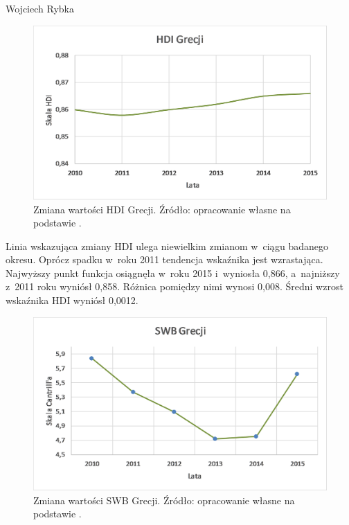 \begin{artplenv}{Wojciech Rybka}
\begin{figure}[h]
	\centering
	\includegraphics[width=1\textwidth]{ART_Rybka/hdi_grecji.png} 
	\caption{Zmiana wartości HDI Grecji.
		Źródło: opracowanie własne na podstawie
		\parencite{united_nations_development_programme_human_2019}.
	}
	\label{fig5:ryb}
\end{figure}

%
%

Linia wskazująca zmiany HDI ulega niewielkim zmianom w~ciągu badanego okresu. Oprócz spadku w~roku 2011 tendencja
wskaźnika jest wzrastająca. Najwyższy punkt funkcja osiągnęła w~roku 2015 i~wyniosła 0,866, a~najniższy z~2011 roku
wyniósł 0,858. Różnica pomiędzy nimi wynosi 0,008. Średni wzrost wskaźnika HDI wyniósł 0,0012. 

\begin{figure}[h]
	\centering
	\includegraphics[width=1\textwidth]{ART_Rybka/swb_grecji.png} 
	\caption{Zmiana wartości SWB Grecji.
		Źródło: opracowanie własne na podstawie
		\parencite{noauthor_world_2018}.
	}
	\label{fig6:ryb}
\end{figure}



\end{artplenv}
